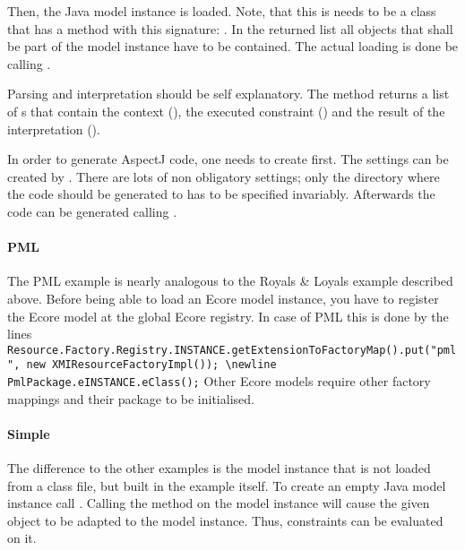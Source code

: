 Then, the Java model instance is loaded. Note, that this is needs to be a class that has a method with this signature: . In the returned list all objects that shall be part of the model instance have to be contained. The actual loading is done be calling .

Parsing and interpretation should be self explanatory. The method  returns a list of s that contain the context (), the executed constraint () and the result of the interpretation ().

In order to generate AspectJ code, one needs to create  first. The settings can be created by . There are lots of non obligatory settings; only the directory where the code should be generated to has to be specified invariably. Afterwards the code can be generated calling .

\paragraph{PML}
\lstset{language=Java}
The PML example is nearly analogous to the Royals & Loyals example described above. Before being able to load an Ecore model instance, you have to register the Ecore model at the global Ecore registry. In case of PML this is done by the lines \lstinline[breaklines=true]{Resource.Factory.Registry.INSTANCE.getExtensionToFactoryMap().put("pml", new XMIResourceFactoryImpl()); \newline PmlPackage.eINSTANCE.eClass();} Other Ecore models require other factory mappings and their package to be initialised.

\paragraph{Simple}
The difference to the other examples is the model instance that is not loaded from a class file, but built in the example itself. To create an empty Java model instance call . Calling the method  on the model instance will cause the given object to be adapted to the model instance. Thus, constraints can be evaluated on it.


